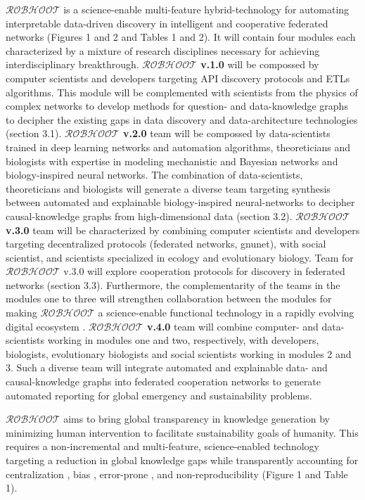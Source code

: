 \documentclass[12pt, a4paper]{article} %
\begin{document}
  {\bf $\mathcal{ROBHOOT}$} is a science-enable multi-feature
  hybrid-technology for automating interpretable data-driven discovery
  in intelligent and cooperative federated networks (Figures 1 and 2
  and Tables 1 and 2). It will contain four modules each characterized
  by a mixture of research disciplines necessary for achieving
  interdisciplinary breakthrough. {\bf $\mathcal{ROBHOOT}$ v.1.0} will
  be compossed by computer scientists and developers targeting API
  discovery protocols and ETLs algorithms. This module will be
  complemented with scientists from the physics of complex networks to
  develop methods for question- and data-knowledge graphs to decipher
  the existing gaps in data discovery and data-architecture
  technologies (section 3.1). {\bf $\mathcal{ROBHOOT}$ v.2.0} team
  will be compossed by data-scientists trained in deep learning
  networks and automation algorithms, theoreticians and biologists
  with expertise in modeling mechanistic and Bayesian networks and
  biology-inspired neural networks. The combination of
  data-scientists, theoreticians and biologists will generate a
  diverse team targeting synthesis between automated and explainable
  biology-inspired neural-networks to decipher causal-knowledge graphs
  from high-dimensional data (section 3.2). {\bf $\mathcal{ROBHOOT}$
    v.3.0} team will be characterized by combining computer scientists
  and developers targeting decentralized protocols (federated
  networks, gnunet), with social scientist, and scientists specialized
  in ecology and evolutionary biology. Team for $\mathcal{ROBHOOT}$
  v.3.0 will explore cooperation protocols for discovery in federated
  networks (section 3.3). Furthermore, the complementarity of the
  teams in the modules one to three will strengthen collaboration
  between the modules for making $\mathcal{ROBHOOT}$ a science-enable
  functional technology in a rapidly evolving digital ecosystem
  \citep{Soto-Valero2019}. {\bf $\mathcal{ROBHOOT}$ v.4.0} team will
  combine computer- and data-scientists working in modules one and
  two, respectively, with developers, biologists, evolutionary
  biologists and social scientists working in modules 2 and 3. Such a
  diverse team will integrate automated and explainable data- and
  causal-knowledge graphs into federated cooperation networks to
  generate automated reporting for global emergency and sustainability
  problems.

  $\mathcal{ROBHOOT}$ aims to bring global transparency in knowledge
  generation by minimizing human intervention to facilitate
  sustainability goals of humanity. This requires a non-incremental
  and multi-feature, science-enabled technology targeting a reduction
  in global knowledge gaps while transparently accounting for
  centralization \citep{Inhaber1977,Gunther2018}⁠⁠, bias⁠⁠
  \citep{Ioannidis2005}, error-prone \citep{Fang2011}, and
  non-reproducibility \citep{Hardwicke2018} (Figure 1 and Table
  1).
\end{document}
